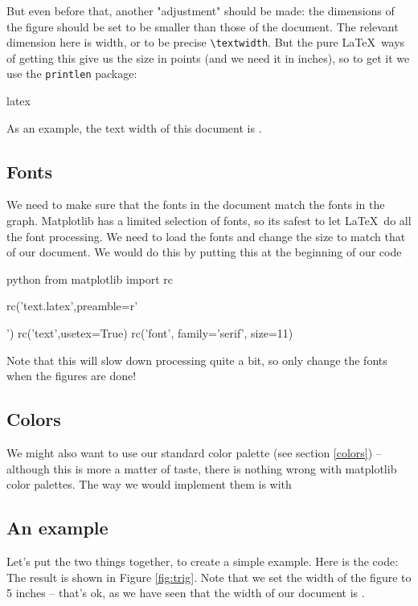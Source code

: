 \documentclass{notes}
\begin{document}
But even before that, another "adjustment" should be made: the dimensions of the figure should be set to be smaller than those of the document. The relevant dimension here is width, or to be precise \texttt{\textbackslash{}textwidth}. But the pure \LaTeX\ ways of getting this give us the size in points (and we need it in inches), so to get it we use the \texttt{printlen} package:
\begin{tminted}{latex}
\printlength{\textwidth}
\end{tminted}
As an example, the text width of this document is \printlength{\textwidth}.



\subsection{Fonts}

We need to make sure that the fonts in the document match the fonts in the graph. Matplotlib has a limited selection of fonts, so its safest to let \LaTeX\ do all the font processing. We need to load the fonts and change the size to match that of our document. We would do this by putting this at the beginning of our code
\begin{tminted}{python}
from matplotlib import rc

rc('text.latex',preamble=r'\usepackage[charter, cal=cmcal]{mathdesign}')
rc('text',usetex=True)
rc('font', family='serif', size=11)
\end{tminted}

Note that this will slow down processing quite a bit, so \alert{only change the fonts when the figures are done!}

\subsection{Colors}

We might also want to use our standard color palette (see section \ref{colors}) -- although this is more a matter of taste, there is nothing wrong with matplotlib color palettes. The way we would implement them is with


\subsection{An example}
Let's put the two things together, to create a simple example. Here is the code:
%
The result is shown in Figure \ref{fig:trig}. Note that we set the width of the figure to 5 inches -- that's ok, as we have seen that the width of our document is \printlength{\textwidth}. 
\end{document}
